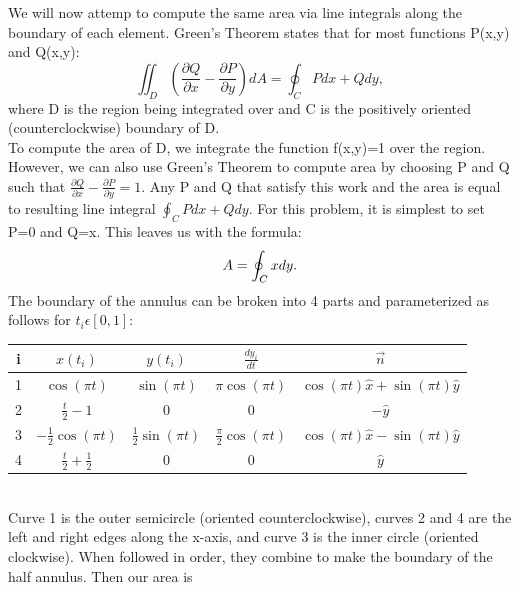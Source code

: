 \documentclass{article}
\begin{document}
We will now attemp to compute the same area via line integrals along the boundary of each element. Green's Theorem states that for most functions P(x,y) and Q(x,y):
\begin{equation*}
\iint_{D}(\frac{\partial Q}{\partial x}-\frac{\partial P}{\partial y})dA=\oint_{C}Pdx+Qdy,
\end{equation*}
where D is the region being integrated over and C is the positively oriented (counterclockwise) boundary of D.\\
To compute the area of D, we integrate the function f(x,y)=1 over the region. However, we can also use Green's Theorem to compute area by choosing P and Q such that $\frac{\partial Q}{\partial x}-\frac{\partial P}{\partial y}=1$. Any P and Q that satisfy this work and the area is equal to resulting line integral $\oint_{C}Pdx+Qdy$. For this problem, it is simplest to set P=0 and Q=x. This leaves us with the formula:
\begin{equation*}
A=\oint_{C}x\space dy.
\end{equation*}
The boundary of the annulus can be broken into 4 parts and parameterized as follows for $t_i\epsilon[0,1]$:\\
\begin{center}
  \begin{tabular}{|c|c|c|c|c|}
      \hline
    i & $x(t_i)$ & $y(t_i)$ & $\frac{dy_i}{dt}$ & $\vec{n}$ \\
        \hline
        1 & $\cos(\pi t)$ & $\sin(\pi t)$ & $\pi \cos(\pi t)$ & $\cos(\pi t)\hat{x}+\sin(\pi t)\hat{y}$ \\
        \hline
        2 & $\frac{t}{2}-1$ & 0 & 0 & $-\hat{y}$ \\
        \hline
        3 & $-\frac{1}{2}\cos(\pi t)$ & $\frac{1}{2}\sin(\pi t)$ & $\frac{\pi}{2} \cos(\pi t)$ & $\cos(\pi t)\hat{x}-\sin(\pi t)\hat{y}$ \\
        \hline
        4 & $\frac{t}{2}+\frac{1}{2}$ & 0 & 0 & $\hat{y}$ \\
        \hline
    \end{tabular}
\end{center}
\mbox{}\\
Curve 1 is the outer semicircle (oriented counterclockwise), curves 2 and 4 are the left and right edges along the x-axis, and curve 3 is the inner circle (oriented clockwise). When followed in order, they combine to make the boundary of the half annulus. Then our area is
\end{document}

